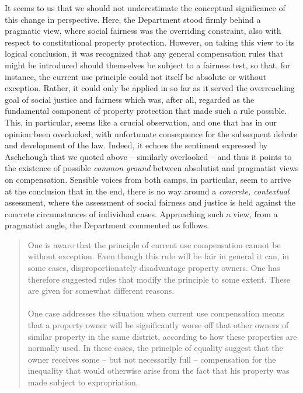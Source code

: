 It seems to us that we should not underestimate the conceptual significance of this change in perspective. Here, the Department stood firmly behind a pragmatic view, where social fairness was the overriding constraint, also with respect to constitutional property protection. However, on taking this view to its logical conclusion, it was recognized that any general compensation rules that might be introduced should themselves be subject to a fairness test, so that, for instance, the current use principle could not itself be absolute or without exception. Rather, it could only be applied in so far as it served the overreaching goal of social justice and fairness which was, after all, regarded as the fundamental component of property protection that made such a rule possible. This, in particular, seems like a crucial observation, and one that has in our opinion been overlooked, with unfortunate consequence for the subsequent debate and development of the law. Indeed, it echoes the sentiment expressed by Aschehough that we quoted above -- similarly overlooked -- and thus it points to the existence of possible \emph{common ground} between absolutist and pragmatist views on compensation. Sensible voices from both camps, in particular, seem to arrive at the conclusion that in the end, there is no way around a \emph{concrete, contextual} assessment, where the assessment of social fairness and justice is held against the concrete circumstances of individual cases. Approaching such a view, from a pragmatist angle, the Department commented as follows.  

\begin{quote}
One is aware that the principle of current use compensation cannot be without exception. Even though this rule will be fair in general it can, in some cases, disproportionately disadvantage property owners. One has therefore suggested rules that modify the principle to some extent. These are given for somewhat different  reasons. \\ \\

One case addresses the situation when current use compensation means that a property owner will be significantly worse off that other owners of similar property in the same district, according to how these properties are normally used. In these cases, the principle of equality suggest that the owner receives some -- but not necessarily full -- compensation for the inequality that would otherwise arise from the fact that his property was made subject to expropriation. %
\end{quote}

